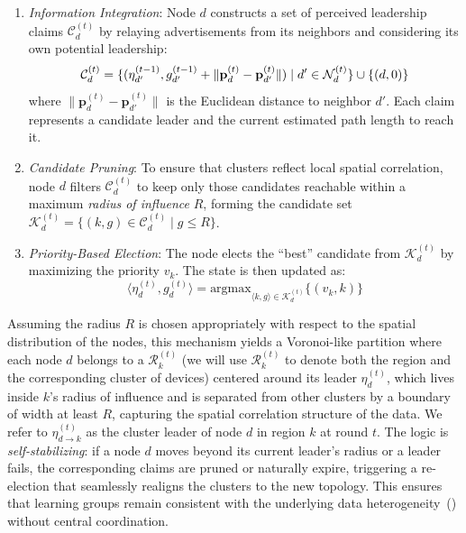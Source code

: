 \documentclass[conference]{IEEEtran}
\theoremstyle{plain}
\theoremstyle{definition}
\begin{document}
\begin{enumerate}
    \item \emph{Information Integration}: 
    Node $d$ constructs a set of perceived leadership claims $\mathcal{C}_d^{(t)}$ by relaying advertisements from its neighbors and considering its own potential leadership:
    \begin{equation}
        \small
        \mathcal{C}_d^{(t)} = \{ (\eta_{d'}^{(t-1)}, g_{d'}^{(t-1)} + \|\mathbf{p}_d^{(t)} - \mathbf{p}_{d'}^{(t)}\|) \mid d' \in \mathcal{N}_d^{(t)} \} \\ \cup \{ (d, 0) \}
    \end{equation}
    where $\|\mathbf{p}_d^{(t)} - \mathbf{p}_{d'}^{(t)}\|$ is the Euclidean distance to neighbor $d'$. Each claim represents a candidate leader and the current estimated path length to reach it.
    \item \emph{Candidate Pruning}: 
    To ensure that clusters reflect local spatial correlation, 
    node $d$ filters $\mathcal{C}_d^{(t)}$ to keep only those candidates reachable within a maximum \emph{radius of influence} $R$, 
    forming the candidate set $\mathcal{K}_d^{(t)} = \{ (k, g) \in \mathcal{C}_d^{(t)} \mid g \le R \}$.
    \item \emph{Priority-Based Election}: The node elects the ``best'' candidate from $\mathcal{K}_d^{(t)}$ by maximizing the priority $v_k$.
    The state is then updated as:
    \begin{equation}
        \langle \eta_d^{(t)}, g_d^{(t)} \rangle = \text{argmax}_{\langle k, g \rangle \in \mathcal{K}_d^{(t)}} \{ (v_k, k) \}
    \end{equation}
\end{enumerate}

Assuming the radius $R$ is chosen appropriately with respect to the spatial distribution of the nodes, 
this mechanism yields a Voronoi-like partition where each node $d$ belongs to a $\mathcal{R}_k^{(t)}$ (we will use $\mathcal{R}_k^{(t)}$ to denote both the region and the corresponding cluster of devices)
centered around its leader $\eta_d^{(t)}$, 
which lives inside $k$'s radius of influence and is separated from other clusters by a boundary of width at least $R$, 
capturing the spatial correlation structure of the data. 
We refer to $\eta_{d \to k}^{(t)}$ as the cluster leader of node $d$ in region $k$ at round $t$.
The logic is \emph{self-stabilizing}: 
 if a node $d$ moves beyond its current leader's radius or a leader fails, 
 the corresponding claims are pruned or naturally expire, 
 triggering a re-election that seamlessly realigns the clusters to the new topology. 
%
This ensures that learning groups remain consistent with the underlying data heterogeneity~() 
 without central coordination.
\end{document}
